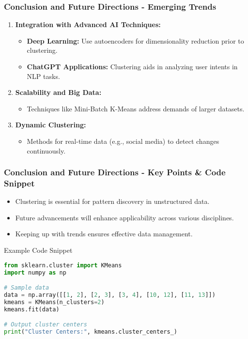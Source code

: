 \documentclass[aspectratio=169]{beamer}
\begin{document}
\begin{frame}[fragile]
    \frametitle{Conclusion and Future Directions - Emerging Trends}
    \begin{enumerate}
        \item \textbf{Integration with Advanced AI Techniques:}
        \begin{itemize}
            \item \textbf{Deep Learning:} Use autoencoders for dimensionality reduction prior to clustering.
            \item \textbf{ChatGPT Applications:} Clustering aids in analyzing user intents in NLP tasks.
        \end{itemize}

        \item \textbf{Scalability and Big Data:}
        \begin{itemize}
            \item Techniques like Mini-Batch K-Means address demands of larger datasets.
        \end{itemize}

        \item \textbf{Dynamic Clustering:}
        \begin{itemize}
            \item Methods for real-time data (e.g., social media) to detect changes continuously.
        \end{itemize}
    \end{enumerate}
\end{frame}

\begin{frame}[fragile]
    \frametitle{Conclusion and Future Directions - Key Points & Code Snippet}
    \begin{itemize}
        \item Clustering is essential for pattern discovery in unstructured data.
        \item Future advancements will enhance applicability across various disciplines.
        \item Keeping up with trends ensures effective data management.
    \end{itemize}

    \begin{block}{Example Code Snippet}
    \begin{lstlisting}[language=Python]
from sklearn.cluster import KMeans
import numpy as np

# Sample data
data = np.array([[1, 2], [2, 3], [3, 4], [10, 12], [11, 13]])
kmeans = KMeans(n_clusters=2)
kmeans.fit(data)

# Output cluster centers
print("Cluster Centers:", kmeans.cluster_centers_)
    \end{lstlisting}
    \end{block}
\end{frame}
\end{document}
